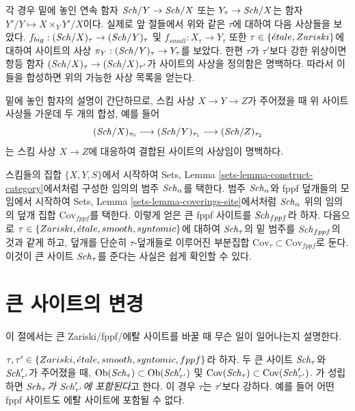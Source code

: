 각 경우 밑에 놓인 연속 함자 $\mathit{Sch}/Y \to \mathit{Sch}/X$ 또는
$Y_\tau \to \mathit{Sch}/X$는 함자 $Y'/Y \mapsto X \times_Y Y'/X$이다. 실제로
앞 절들에서 위와 같은 $\tau$에 대하여 다음 사상들을 보았다.
$f_{big} : (\mathit{Sch}/X)_\tau \to (\mathit{Sch}/Y)_\tau$
및
$f_{small} : X_\tau \to Y_\tau$
또한 $\tau \in \{{\acute{e}tale}, Zariski\}$에 대하여 사이트의 사상
$\pi_Y : (\mathit{Sch}/Y)_\tau \to Y_\tau$를 보았다. 한편 $\tau$가 $\tau'$보다
강한 위상이면 항등 함자 $(\mathit{Sch}/X)_\tau \to (\mathit{Sch}/X)_{\tau'}$가 사이트의
사상을 정의함은 명백하다. 따라서 이들을 합성하면 위의 가능한 사상 목록을
얻는다.

\medskip\noindent
밑에 놓인 함자의 설명이 간단하므로, 스킴 사상 $X \to Y \to Z$가 주어졌을
때 위 사이트 사상들 가운데 두 개의 합성, 예를 들어
$$
(\mathit{Sch}/X)_{\tau_0} \longrightarrow
(\mathit{Sch}/Y)_{\tau_1} \longrightarrow
(\mathit{Sch}/Z)_{\tau_2}
$$
는 스킴 사상 $X \to Z$에 대응하여 결합된 사이트의 사상임이 명백하다.

\begin{remark}
\label{remark-choice-sites}
스킴들의 집합 $\{X, Y, S\}$에서 시작하여 Sets, Lemma
\ref{sets-lemma-construct-category}에서처럼 구성한 임의의 범주
$\mathit{Sch}_\alpha$를 택한다. 범주 $\mathit{Sch}_\alpha$와 fppf 덮개들의 모임에서
시작하여 Sets, Lemma \ref{sets-lemma-coverings-site}에서처럼
$\mathit{Sch}_\alpha$ 위의 임의의 덮개 집합 $\text{Cov}_{fppf}$를 택한다. 이렇게
얻은 큰 fppf 사이트를 $\mathit{Sch}_{fppf}$라 하자. 다음으로
$\tau \in \{Zariski, {\acute{e}tale}, smooth, syntomic\}$에 대하여 $\mathit{Sch}_\tau$의
밑 범주를 $\mathit{Sch}_{fppf}$의 것과 같게 하고, 덮개를 단순히 $\tau$-덮개들로
이루어진 부분집합 $\text{Cov}_\tau \subset \text{Cov}_{fppf}$로 둔다.
이것이 큰 사이트 $\mathit{Sch}_\tau$를 준다는 사실은 쉽게 확인할 수 있다.
\end{remark}









\section{큰 사이트의 변경}
\label{section-change-alpha}

\noindent
이 절에서는 큰 Zariski/fppf/\'에탈 사이트를 바꿀 때 무슨 일이 일어나는지
설명한다.

\medskip\noindent
$\tau, \tau' \in \{Zariski, {\acute{e}tale}, smooth, syntomic, fppf\}$라 하자. 두 큰
사이트 $\mathit{Sch}_\tau$와 $\mathit{Sch}'_{\tau'}$가 주어졌을 때,
$\mathop{\mathrm{Ob}}\nolimits(\mathit{Sch}_\tau) \subset \mathop{\mathrm{Ob}}\nolimits(\mathit{Sch}'_{\tau'})$
및
$\text{Cov}(\mathit{Sch}_\tau) \subset \text{Cov}(\mathit{Sch}'_{\tau'})$.
가 성립하면 {\it $\mathit{Sch}_\tau$가 $\mathit{Sch}'_{\tau'}$에 포함된다}고 한다. 이 경우
$\tau$는 $\tau'$보다 강하다. 예를 들어 어떤 fppf 사이트도 \'에탈 사이트에
포함될 수 없다.

